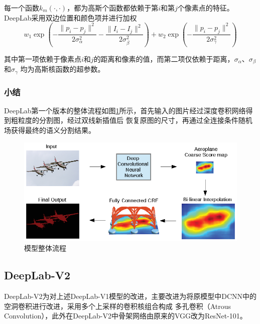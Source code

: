 \documentclass[10pt, a4paper]{article}
\begin{document}
每一个函数$k_m(\cdot, \cdot)$，都为高斯个函数都依赖于第$i$和第$j$个像素点的特征。DeepLab采用双边位置和颜色项并进行加权
\begin{equation}
    w_1\exp\left(-\frac{\|p_i - p_j\|^2}{2\sigma_\alpha^2} - \frac{\|I_i - I_j\|^2}{2\sigma_\beta^2}\right) + 
    w_2\exp\left(-\frac{\|p_i - p_j\|^2}{2\sigma_\gamma^2}\right)
\end{equation}

其中第一项依赖于像素点$i$和$j$的距离和像素的值，而第二项仅依赖于距离，$\sigma_\alpha$、$\sigma_\beta$和$\sigma_\gamma$
均为高斯核函数的超参数。

\subsubsection{小结}
DeepLab第一个版本的整体流程如图\ref{p4}所示，首先输入的图片经过深度卷积网络得到粗粒度的分割图，经过双线新插值后
恢复原图的尺寸，再通过全连接条件随机场获得最终的语义分割结果。
\begin{figure}[htbp]
    \centering
    \includegraphics[width=\textwidth]{imgs/p4.eps}
    \caption{模型整体流程}
    \label{p4}
\end{figure}

\subsection{DeepLab-V2}
DeepLab-V2为对上述DeepLab-V1模型的改进，主要改进为将原模型中DCNN中的空洞卷积进行改进，采用多个上采样的卷积核组合构成
多孔卷积（Atrous Convolution），此外在DeepLab-V2中骨架网络由原来的VGG改为ResNet-101\cite{ResNet}。
\end{document}
